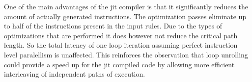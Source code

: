 One of the main advantages of the jit compiler is that it significantly reduces the amount of actually generated instructions. The optimization passes eliminate up to half of the instructions present in the input rules. Due to the types of optimizations that are performed it does however not reduce the critical path length. So the total latency of one loop iteration assuming perfect instruction level paralellism is unaffected. This reinforces the observation that loop unrolling could provide a speed up for the jit compiled code by allowing more efficient interleaving of independent paths of execution.



